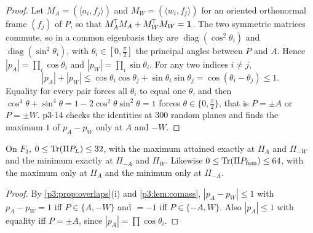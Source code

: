 \begin{proof}
Let $M_A=(\langle a_i,f_j\rangle)$ and $M_W=(\langle w_i,f_j\rangle)$ for an oriented orthonormal frame $(f_j)$ of $P$, so that $M_A^{\!\top}M_A+M_W^{\!\top}M_W=\mathbf 1$. The two
symmetric matrices commute, so in a common eigenbasis they are $\operatorname{diag}(\cos^2\theta_i)$ and $\operatorname{diag}(\sin^2\theta_i)$, with
$\theta_i\in[0,\tfrac\pi2]$ the principal angles between $P$ and $A$. Hence $|p_A|=\prod_i\cos\theta_i$ and $|p_W|=\prod_i\sin\theta_i$. For any two indices $i\neq j$,
\[
|p_A|+|p_W|\le\cos\theta_i\cos\theta_j+\sin\theta_i\sin\theta_j=\cos(\theta_i-\theta_j)\le1 .
\]
Equality for every pair forces all $\theta_i$ to equal one $\theta$, and then $\cos^4\theta+\sin^4\theta=1-2\cos^2\theta\sin^2\theta=1$ forces $\theta\in\{0,\tfrac\pi2\}$,
that is $P=\pm A$ or $P=\pm W$. p3-14 checks the identities at $300$ random planes and finds the maximum $1$ of $p_A-p_W$ only at $A$ and $-W$.
\end{proof}

\begin{corollary}
\label{p3:cor:extremes}
On $F_3$, $0\le\operatorname{Tr}(\Pi P_L)\le32$, with the maximum attained exactly at $\Pi_A$ and $\Pi_{-W}$ and the minimum exactly at $\Pi_{-A}$ and $\Pi_W$. Likewise
$0\le\operatorname{Tr}(\Pi P_{\rm fam})\le64$, with the maximum only at $\Pi_A$ and the minimum only at $\Pi_{-A}$.
\end{corollary}

\begin{proof}
By \cref{p3:prop:overlaps}(i) and \cref{p3:lem:comass}, $|p_A-p_W|\le1$ with $p_A-p_W=1$ iff $P\in\{A,-W\}$ and $=-1$ iff $P\in\{-A,W\}$. Also $|p_A|\le1$ with equality
iff $P=\pm A$, since $|p_A|=\prod\cos\theta_i$.
\end{proof}

